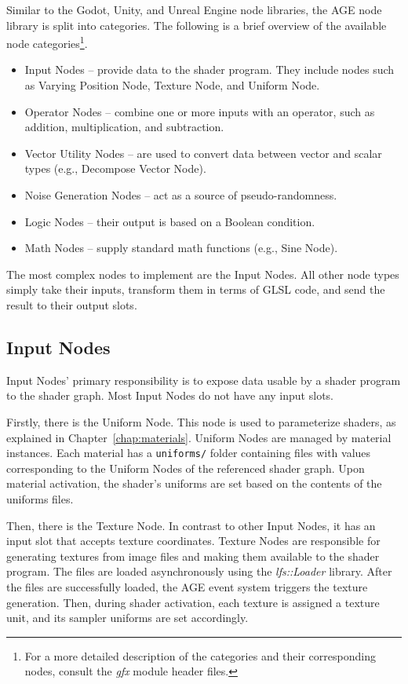 \documentclass[
  digital,     %
  oneside,     %
  nosansbold,  %
  nocolorbold, %
  lof,         %
  lot,         %
]{fithesis4}
\begin{document}
Similar to the Godot, Unity, and Unreal Engine node libraries, the AGE node library is split into
categories. The following is a brief overview of the available node categories\footnote{For a more
detailed description of the categories and their corresponding nodes,
consult the \textit{gfx} module header files.}.
\begin{itemize}
    \item Input Nodes -- provide data to the shader program. They include nodes such as Varying Position Node,
    Texture Node, and Uniform Node.
    \item Operator Nodes -- combine one or more inputs with an operator, such as addition, multiplication,
    and subtraction.
    \item Vector Utility Nodes -- are used to convert data between vector and scalar types (e.g., Decompose Vector Node).
    \item Noise Generation Nodes -- act as a source of pseudo-randomness.
    \item Logic Nodes -- their output is based on a Boolean condition.
    \item Math Nodes -- supply standard math functions (e.g., Sine Node).
\end{itemize}

The most complex nodes to implement are the Input Nodes. All other node types simply take their inputs,
transform them in terms of GLSL code, and send the result to their output slots.

\subsection{Input Nodes}
Input Nodes' primary responsibility is to expose data usable by a shader program to the shader graph.
Most Input Nodes do not have any input slots.

Firstly, there is the Uniform Node.
This node is used to parameterize shaders, as explained in Chapter~\ref{chap:materials}.
Uniform Nodes are managed by material instances. Each material has a \verb|uniforms/| folder
containing files with values corresponding to the Uniform Nodes of the referenced shader graph.
Upon material activation, the shader's uniforms are set based on the contents of the uniforms files.

Then, there is the Texture Node. In contrast to other Input Nodes, it has an input slot that accepts texture coordinates.
Texture Nodes are responsible for generating textures from image
files and making them available to the shader program. The files are loaded asynchronously using the
\textit{lfs::Loader} library. After the files are successfully loaded, the AGE event system triggers the texture generation.
Then, during shader activation, each texture is assigned
a texture unit, and its sampler uniforms are set accordingly.
\end{document}
